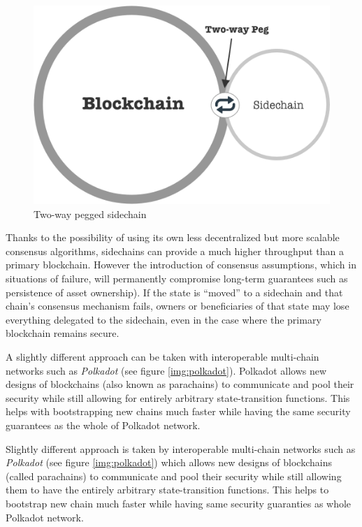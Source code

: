 \documentclass[a4paper,12pt]{article}
\begin{document}
\begin{figure}[H]
    \centering
    \includegraphics[scale=0.5]{../img/sidechain}
    \caption{Two-way pegged sidechain}
    \label{img:sidechain}
\end{figure}

Thanks to the possibility of using its own less decentralized but more scalable 
consensus algorithms, sidechains can provide a much higher throughput than a 
primary blockchain. However the introduction of consensus assumptions, which in 
situations of failure, will permanently compromise long-term guarantees such as 
persistence of asset ownership). If the state is “moved” to a sidechain and that 
chain’s consensus mechanism fails, owners or beneficiaries of that state may lose 
everything delegated to the sidechain, even in the case where the primary 
blockchain remains secure.

A slightly different approach can be taken with interoperable multi-chain networks 
such as \textit{Polkadot} (see figure \ref{img:polkadot}). Polkadot allows new 
designs of blockchains (also known as parachains) to communicate and pool their 
security while still allowing for entirely arbitrary state-transition functions. 
This helps with bootstrapping new chains much faster while having the same security 
guarantees as the whole of Polkadot network.

Slightly different approach is taken by interoperable multi-chain networks such 
as \textit{Polkadot} (see figure \ref{img:polkadot}) which allows new designs of
blockchains (called parachains) to communicate and pool their security while 
still allowing them to have the entirely arbitrary state-transition functions. 
This helps to bootstrap new chain much faster while having same security 
guaranties as whole Polkadot network.
\end{document}
